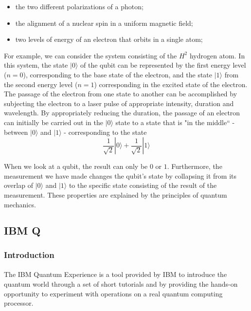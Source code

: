 \documentclass[a4paper,10pt]{article}
\begin{document}
\begin{itemize}
    \item the two different polarizations of a photon;
    \item the alignment of a nuclear spin in a uniform magnetic field;
    \item two levels of energy of an electron that orbits in a single atom;
\end{itemize}

For example, we can consider the system consisting of the $H^2$ hydrogen atom. In this system, the state $|0\rangle$ of the qubit can be represented by the first energy level ($n = 0$), corresponding to the base state of the electron, and the state $|1\rangle$ from the second energy level ($n = 1$) corresponding in the excited state of the electron. The passage of the electron from one state to another can be accomplished by subjecting the electron to a laser pulse of appropriate intensity, duration and wavelength. By appropriately reducing the duration, the passage of an electron can initially be carried out in the $|0\rangle$ state to a state that is "in the middle`` - between $|0\rangle$ and $|1\rangle$ - corresponding to the state $$\frac{1}{\sqrt{2}}|0\rangle + \frac{1}{\sqrt{2}}|1\rangle$$

When we look at a qubit, the result can only be $0$ or $1$. Furthermore, the measurement we have made changes the qubit's state by collapsing it from its overlap of $|0\rangle$ and $|1\rangle$ to the specific state consisting of the result of the measurement. These properties are explained by the principles of quantum mechanics.

\subsection{IBM Q} 

\subsubsection{Introduction}

\paragraph{} The IBM Quantum Experience is a tool provided by IBM to introduce the quantum world through a set of short tutorials and by providing the hands-on opportunity to experiment with operations on a real quantum computing processor. 
\end{document}
